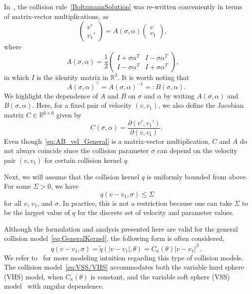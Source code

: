\documentclass[12pt]{amsart}
\newcommand{\bbR}{\mathbb R} \newcommand{\bbS}{\mathbb S}
\newcommand{\Rthree}{{\bbR^3}}
\begin{document}
In~\cite{caflisch2021adjoint}, the collision rule~\eqref{BoltzmannSolution} was re-written conveniently in terms of matrix-vector multiplications, as
\begin{equation}\label{eq:AB_vel_General}
        \begin{pmatrix}
    v'\\
   v_1'
    \end{pmatrix}    = A(\sigma,\alpha) \begin{pmatrix}
    v\\
    v_1
     \end{pmatrix},
   \quad 
\end{equation}
where
\begin{equation} \label{eq:AB_def}
A(\sigma ,\alpha )= \dfrac{1}{2}\begin{pmatrix}
    I+\sigma  \alpha ^T & I-\sigma  \alpha ^T\\
    I-\sigma  \alpha ^T & I+\sigma  \alpha ^T
    \end{pmatrix},\quad 
\end{equation}
in which $I$ is the identity matrix in $\Rthree$. It is worth noting that 
$$
A(\sigma ,\alpha )^\top = A(\sigma ,\alpha )^{-1}= : B(\sigma ,\alpha ).
$$
We highlight the dependence of $A$ and $B$ on $\sigma$ and $\alpha$ by writing $A(\sigma ,\alpha )$ and $B(\sigma ,\alpha )$. Here, for a fixed pair of velocity $(v,v_1)$, we also define the Jacobian matrix $C\in\mathbb{R}^{6\times 6}$ given by
\begin{equation}\label{eq:C_def}
C(\sigma,\alpha) = \dfrac{\partial (v',v_1')}{\partial (v,v_1)}.
\end{equation}
Even though~\eqref{eq:AB_vel_General} is a matrix-vector multiplication, $C$ and $A$ do not always coincide since the collision parameter $\sigma$ can depend on the velocity pair $(v,v_1)$ for certain collision kernel $q$.


Next, we will assume that the collision kernel $q$ is uniformly bounded from above. For some $\Sigma>0$, we have
\begin{equation}~\label{eq:UpperBound}
    q(v-v_1,\sigma) \leq \Sigma
\end{equation}
for all  $v$, $v_1$, and $\sigma$. In practice, this is not a restriction because one can take $\Sigma$ to be the largest value of $q$ for the discrete set of velocity and parameter values.

Although the formulation and analysis presented here are valid for the general collision model~\eqref{eq:GeneralKernel}, the following form is often considered,
\begin{equation}\label{eq:VSS/VHS}
    q(v-v_1,\sigma) =  \tilde q(|v-v_1|,\theta) = C_\kappa(\theta) |v-v_1|^\beta\,.
\end{equation}
We refer to~\cite[Sec.~1.4]{villani2002review} for more modeling intuition regarding this type of collision models. The collision model~\eqref{eq:VSS/VHS} accommodates both the variable hard sphere (VHS) model, when $C_\kappa(\theta)$ is constant, and the variable soft sphere (VSS) model~\cite{KouraMatsumoto} with angular dependence. 
\end{document}
